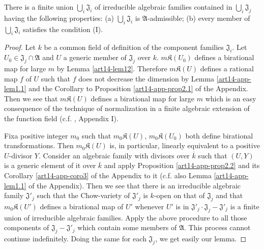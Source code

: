 \begin{lemma}\label{art14-lem17}
There is a finite union $\bigcup_{i}\mathfrak{J}_{i}$ of irreducible algebraic families contained in $\bigcup_{i}\mathfrak{J}_{j}$ having the following properties: {\rm(a)} $\bigcup_{i}\mathfrak{J}_{i}$ is $\mathfrak{A}$-admissible; {\rm(b)} every member of $\bigcup_{i}\mathfrak{J}_{i}$ satisfies the condition {\rm(I)}.
\end{lemma}

\begin{proof}
Let $k$ be a common field of definition of the component families $\mathfrak{J}_{i}$. Let $U_{0}\in \mathfrak{J}_{j}\cap \mathfrak{A}$ and $U$ a generic member of $\mathfrak{J}_{j}$ over $k$. $m\mathfrak{K}(U_{0})$ defines a birational map for large $m$ by Lemma \ref{art14-lem12}. Therefore $m\mathfrak{K}(U)$ defines a rational map $f$ of $U$ such that $f$ does not decrease the dimension by Lemma \ref{art14-app-lem1.1} and the Corollary to Proposition \ref{art14-app-prop2.1} of the Appendix. Then we see that $m\mathfrak{K}(U)$ defines a birational map for large $m$ which is an easy consequence of the technique of normalization in a finite algebraic extension of the function field (c.f. \cite{art14-key25}, Appendix I).

Fix\pageoriginale a positive integer $m_{0}$ such that $m_{0}\mathfrak{K}(U)$, $m_{0}\mathfrak{K}(U_{0})$ both define birational transformations. Then $m_{0}\mathfrak{K}(U)$ is, in particular, linearly equivalent to a positive $U$-divisor $Y$. Consider an algebraic family with divisors over $\overline{k}$ such that $(U,Y)$ is a generic element of it over $\overline{k}$ and apply Proposition \ref{art14-app-prop2.2} and its Corollary \ref{art14-app-coro3} of the Appendix to it (c.f. also Lemma \ref{art14-app-lem1.1} of the Appendix). Then we see that there is an irreducible algebraic family $\mathfrak{J}'_{j}$ such that the Chow-variety of $\mathfrak{J}'_{j}$ is $k$-open on that of $\mathfrak{J}_{j}$ and that $m_{0}\mathfrak{K}(U')$ defines a birational map of $U'$ whenever $U'$ is in $\mathfrak{J}'_{j}\cdot \mathfrak{J}_{j}-\mathfrak{J}'_{j}$ is a finite union of irreducible algebraic families. Apply the above procedure to all those components of $\mathfrak{J}_{j}-\mathfrak{J}'_{j}$ which contain some members of $\mathfrak{A}$. This process cannot continue indefinitely. Doing the same for each $\mathfrak{J}_{j}$, we get easily our lemma.
\end{proof}

